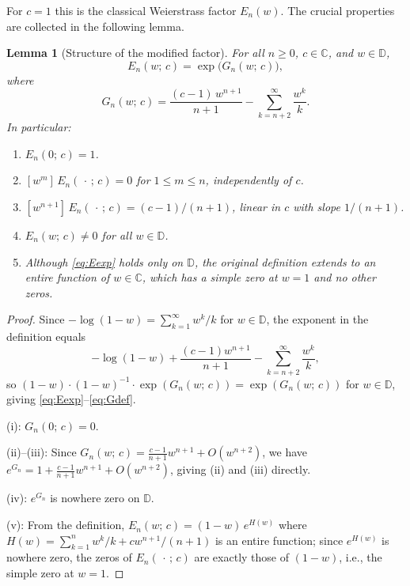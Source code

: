 \documentclass{amsart}
\newtheorem{lemma}[theorem]{Lemma}
\theoremstyle{definition}
\newcommand{\D}{\mathbb{D}}
\newcommand{\C}{\mathbb{C}}
\begin{document}
For $c = 1$ this is the classical Weierstrass factor $E_n(w)$.  The
crucial properties are collected in the following lemma.

\begin{lemma}[Structure of the modified factor]
\label{lem:structure}
For all $n \geq 0$, $c \in \C$, and $w \in \D$,
\begin{equation}
\label{eq:Eexp}
  E_n(w;\,c) = \exp\bigl(G_n(w;\,c)\bigr),
\end{equation}
where
\begin{equation}
\label{eq:Gdef}
  G_n(w;\,c)
  = \frac{(c-1)\,w^{n+1}}{n+1} - \sum_{k=n+2}^{\infty}\frac{w^k}{k}.
\end{equation}
In particular:
\begin{enumerate}
\item[(i)] $E_n(0;\,c) = 1$.
\item[(ii)] $[w^m]\,E_n(\,\cdot\,;\,c) = 0$ for $1 \leq m \leq n$,
  independently of $c$.
\item[(iii)] $[w^{n+1}]\,E_n(\,\cdot\,;\,c) = (c-1)/(n+1)$,
  linear in $c$ with slope $1/(n+1)$.
\item[(iv)] $E_n(w;\,c) \neq 0$ for all $w \in \D$.
\item[(v)] Although \eqref{eq:Eexp} holds only on $\D$, the original
  definition extends to an entire function of $w \in \C$, which has a
  simple zero at $w = 1$ and no other zeros.
\end{enumerate}
\end{lemma}

\begin{proof}
Since $-\log(1-w) = \sum_{k=1}^{\infty} w^k/k$ for $w \in \D$, the
exponent in the definition equals
\[
  -\log(1-w) + \frac{(c-1)w^{n+1}}{n+1} - \sum_{k=n+2}^{\infty}\frac{w^k}{k},
\]
so $(1-w)\cdot(1-w)^{-1}\cdot\exp(G_n(w;\,c)) = \exp(G_n(w;\,c))$
for $w \in \D$, giving \eqref{eq:Eexp}--\eqref{eq:Gdef}.

(i): $G_n(0;\,c) = 0$.

(ii)--(iii): Since $G_n(w;\,c) = \tfrac{c-1}{n+1}w^{n+1} + O(w^{n+2})$,
we have $e^{G_n} = 1 + \tfrac{c-1}{n+1}w^{n+1} + O(w^{n+2})$,
giving (ii) and (iii) directly.

(iv): $e^{G_n}$ is nowhere zero on $\D$.

(v): From the definition, $E_n(w;\,c) = (1-w)\,e^{H(w)}$ where
$H(w) = \sum_{k=1}^n w^k/k + cw^{n+1}/(n+1)$ is an entire function;
since $e^{H(w)}$ is nowhere zero, the zeros of $E_n(\,\cdot\,;\,c)$ are
exactly those of $(1-w)$, i.e., the simple zero at $w=1$.
\end{proof}
\end{document}
